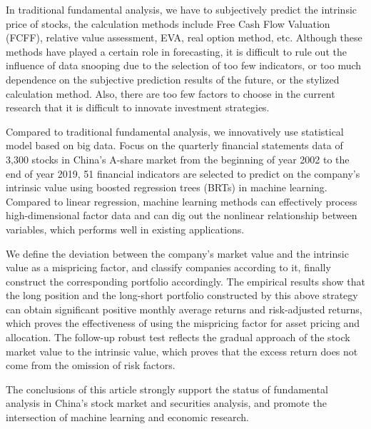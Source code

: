 
In traditional fundamental analysis, we have to subjectively predict the intrinsic price of stocks, the calculation methods include Free Cash Flow Valuation (FCFF), relative value assessment, EVA, real option method, etc. Although these methods have played a certain role in forecasting, it is difficult to rule out the influence of data snooping due to the selection of too few indicators, or too much dependence on the subjective prediction results of the future, or the stylized calculation method. Also, there are too few factors to choose in the current research that it is difficult to innovate investment strategies.

Compared to traditional fundamental analysis, we innovatively use statistical model based on big data. Focus on the quarterly financial statements data of 3,300 stocks in China's A-share market from the beginning of year 2002 to the end of year 2019, 51 financial indicators are selected to predict on the company's intrinsic value using boosted regression trees (BRTs) in machine learning. Compared to linear regression, machine learning methods can effectively process high-dimensional factor data and can dig out the nonlinear relationship between variables, which performs well in existing applications.

We define the deviation between the company's market value and the intrinsic value as a mispricing factor, and classify companies according to it, finally construct the corresponding portfolio accordingly. The empirical results show that the long position and the long-short portfolio constructed by this above strategy can obtain significant positive monthly average returns and risk-adjusted returns, which proves the effectiveness of using the mispricing factor for asset pricing and allocation. The follow-up robust test reflects the gradual approach of the stock market value to the intrinsic value, which proves that the excess return does not come from the omission of risk factors. 

The conclusions of this article strongly support the status of fundamental analysis in China's stock market and securities analysis, and promote the intersection of machine learning and economic research.